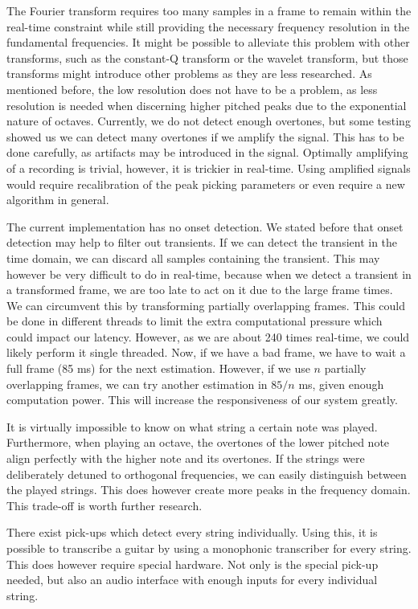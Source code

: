 \documentclass[10pt,twocolumn]{article}
\begin{document}
The Fourier transform requires too many samples in a frame to remain within the real-time constraint while still providing the necessary frequency resolution in the fundamental frequencies. It might be possible to alleviate this problem with other transforms, such as the constant-Q transform or the wavelet transform, but those transforms might introduce other problems as they are less researched. As mentioned before, the low resolution does not have to be a problem, as less resolution is needed when discerning higher pitched peaks due to the exponential nature of octaves. Currently, we do not detect enough overtones, but some testing showed us we can detect many overtones if we amplify the signal. This has to be done carefully, as artifacts may be introduced in the signal. Optimally amplifying of a recording is trivial, however, it is trickier in real-time. Using amplified signals would require recalibration of the peak picking parameters or even require a new algorithm in general.

The current implementation has no onset detection. We stated before that onset detection may help to filter out transients. If we can detect the transient in the time domain, we can discard all samples containing the transient. This may however be very difficult to do in real-time, because when we detect a transient in a transformed frame, we are too late to act on it due to the large frame times. We can circumvent this by transforming partially overlapping frames. This could be done in different threads to limit the extra computational pressure which could impact our latency. However, as we are about 240 times real-time, we could likely perform it single threaded. Now, if we have a bad frame, we have to wait a full frame (85 ms) for the next estimation. However, if we use $n$ partially overlapping frames, we can try another estimation in $85/n$ ms, given enough computation power. This will increase the responsiveness of our system greatly.

It is virtually impossible to know on what string a certain note was played. Furthermore, when playing an octave, the overtones of the lower pitched note align perfectly with the higher note and its overtones. If the strings were deliberately detuned to orthogonal frequencies, we can easily distinguish between the played strings. This does however create more peaks in the frequency domain. This trade-off is worth further research.

There exist pick-ups which detect every string individually. Using this, it is possible to transcribe a guitar by using a monophonic transcriber for every string. This does however require special hardware. Not only is the special pick-up needed, but also an audio interface with enough inputs for every individual string.





\end{document}
